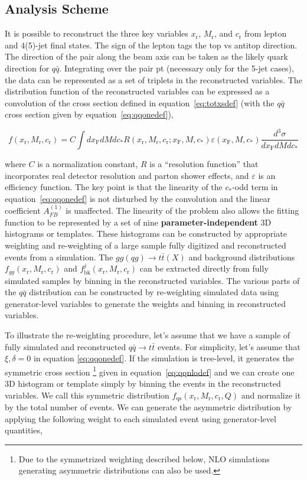 \clearpage
\subsection{Analysis Scheme}
\label{sec:analysis scheme}
It is possible to reconstruct the three key variables $x_\mathrm{r}$, $M_\mathrm{r}$, and $c_\mathrm{r}$ from lepton and 4(5)-jet final states.  The sign of the lepton tags the top vs antitop direction.  The direction of the pair along the beam axis can be taken as the likely quark direction for $q\bar q$.  Integrating over the pair pt (necessary only for the 5-jet cases), the data can be represented as a set of triplets in the reconstructed variables.  The distribution function of the reconstructed variables can be expressed as a convolution of the cross section defined in equation~\ref{eq:totxsdef} (with the $q\bar q$ cross section given by equation~\ref{eq:qqonedef}),

\begin{equation}
f(x_\mathrm{r},M_\mathrm{r},c_\mathrm{r}) = C \int dx_\mathrm{F}dMdc_* R(x_\mathrm{r},M_\mathrm{r},c_\mathrm{r}; x_\mathrm{F}, M, c_*)\varepsilon (x_\mathrm{F}, M, c_*) \frac{d^3\sigma}{dx_\mathrm{F}dM dc_*} 
\end{equation}

where $C$ is a normalization constant, $R$ is a ``resolution function'' that incorporates real detector resolution and parton shower effects, and $\varepsilon$ is an efficiency function.  The key point is that the linearity of the $c_*$-odd term in equation~\ref{eq:qqonedef} is not disturbed by the convolution and the linear coefficient $A_{FB}^{(1)}$ is unaffected.  The linearity of the problem also allows the fitting function to be represented by a set of nine {\bf parameter-independent} 3D histograms or templates.  These histograms can be constructed by appropriate weighting and re-weighting of a large sample fully digitized and reconstructed events from a simulation.  The $gg(qg)\to t\bar t(X)$ and background distributions $f_{gg}(x_\mathrm{r},M_\mathrm{r},c_\mathrm{r})$ and $f^j_\mathrm{bk}(x_\mathrm{r},M_\mathrm{r},c_\mathrm{r})$ can be extracted directly from fully simulated samples by binning in the reconstructed variables.  The various parts of the $q\bar q$ distribution can be constructed by re-weighting simulated data using generator-level variables to generate the weights and binning in reconstructed variables. 

To illustrate the re-weighting procedure, let's assume that we have a sample of fully simulated and reconstructed $q\bar q \to t\bar t$ events.  For simplicity, let's assume that $\xi,\delta=0$ in equation \ref{eq:qqonedef}.  If the simulation is tree-level, it generates the symmetric cross section \footnote{Due to the symmetrized weighting described below, NLO simulations generating asymmetric distributions can also be used.} given in equation~\ref{eq:qqnlodef} and we can create one 3D histogram or template simply by binning the events in the reconstructed variables.  We call this symmetric distribution $f_\mathrm{qs}(x_\mathrm{r}, M_\mathrm{r}, c_\mathrm{r}, Q)$ and normalize it by the total number of events.  We can generate the asymmetric distribution by applying the following weight to each simulated event using generator-level quantities,

